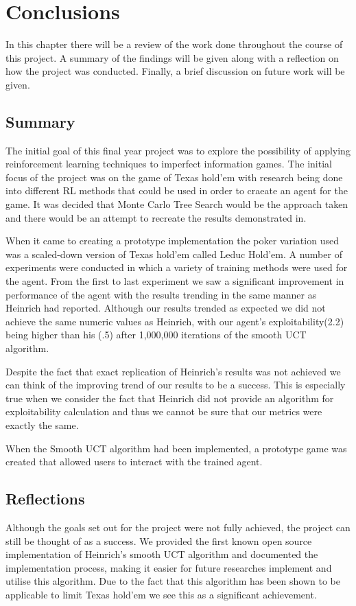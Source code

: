 \chapter{Conclusions}\label{ch:conclusions}
In this chapter there will be a review of the work done throughout the course of this project.
A summary of the findings will be given along with a reflection on how the project was conducted.
Finally, a brief discussion on future work will be given.

\section{Summary}\label{sec:summary}
The initial goal of this final year project was to explore the possibility of applying
reinforcement learning techniques to imperfect information games.
The initial focus of the project was on the game of Texas hold'em with research being
done into different RL methods that could be used in order to craeate an agent for the game.
It was decided that Monte Carlo Tree Search would be the approach taken and there would be
an attempt to recreate the results demonstrated in\citep{heinrich2017reinforcement}.

When it came to creating a prototype implementation the poker variation used was a
scaled-down version of Texas hold'em called Leduc Hold'em.
A number of experiments were conducted in which a variety of training methods were used
for the agent.
From the first to last experiment we saw a significant improvement in performance of the
agent with the results trending in the same manner as Heinrich had reported.
Although our results trended as expected we did not achieve the same numeric values as Heinrich,
with our agent's exploitability(2.2) being higher than his (.5) after 1,000,000
iterations of the smooth UCT algorithm.

Despite the fact that exact replication of Heinrich's results was not achieved we can
think of the improving trend of our results to be a success.
This is especially true when we consider the fact that Heinrich did not provide
an algorithm for exploitability calculation and thus we cannot be sure that our metrics
were exactly the same.

When the Smooth UCT algorithm had been implemented, a prototype game was created that
allowed users to interact with the trained agent.

\section{Reflections}\label{sec:reflections}
Although the goals set out for the project were not fully achieved, the project can
still be thought of as a success.
We provided the first known open source implementation of Heinrich's smooth UCT algorithm and
documented the implementation process, making it easier for future researches implement and
utilise this algorithm.
Due to the fact that this algorithm has been shown to be applicable to limit Texas hold'em\citep{heinrich2015smooth}
we see this as a significant achievement.


